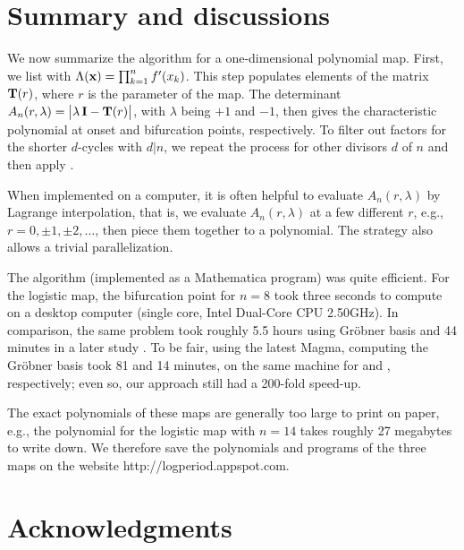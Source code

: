 \documentclass[twocolumn]{revtex4-1}
\begin{document}
\section{\label{sec:end}Summary and discussions}


We now summarize the algorithm for a one-dimensional polynomial map.
%
First, we list   with $\Lambda(\mathbf{x}) = \prod_{k=1}^n f'(x_k)$.
This step populates elements of the matrix $\mathbf{T}(r)$,
where $r$ is the parameter of the map.
%
The determinant $A_n(r, \lambda) = \big|\lambda \, \mathbf{I} - \mathbf{T}(r)\big|$,
with $\lambda$ being $+1$ and $-1$, then gives the characteristic
polynomial at onset and bifurcation points, respectively.
%
To filter out factors for the shorter $d$-cycles with $d|n$,
  we repeat the process for other divisors $d$ of $n$
  and then apply .
%


When implemented on a computer,
it is often helpful to evaluate $A_n(r,\lambda)$ by Lagrange interpolation,
that is, we evaluate $A_n(r, \lambda)$ at a few different $r$,
e.g., $r = 0, \pm1, \pm2,\ldots$, then piece them together
to a polynomial.
The strategy also allows a trivial parallelization.



The algorithm (implemented as a Mathematica program)
was quite efficient.
%
For the logistic map, the bifurcation point for $n = 8$
took three seconds to compute on a desktop computer
(single core, Intel\textsuperscript{\textregistered} Dual-Core CPU 2.50GHz).
%
In comparison,
  the same problem took roughly 5.5 hours \cite{kk1}
  using Gr\"obner basis
  and 44 minutes in a later study \cite{lewis}.
To be fair, using the latest Magma, computing the Gr\"obner basis
  took 81 and 14 minutes, on the same machine
  for  and , respectively;
even so, our approach still had a 200-fold speed-up.




%
The exact polynomials of these maps are generally too large to print on paper,
  e.g., the polynomial for the logistic map with $n = 14$
    takes roughly 27 megabytes to write down.
%
We therefore save the polynomials and programs of the three maps on the website
http://logperiod.appspot.com.




\section*{Acknowledgments}
\end{document}
